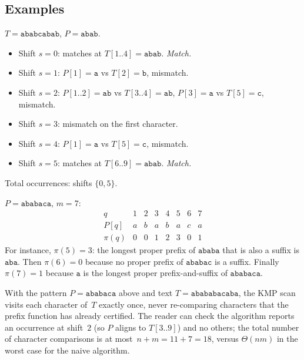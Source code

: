 \subsection*{Examples}

\begin{example}
\label{ex:naive-search}
$T = \texttt{ababcabab}$, $P = \texttt{abab}$.
\begin{itemize}
  \item Shift $s = 0$: matches at $T[1..4] = \texttt{abab}$. \emph{Match.}
  \item Shift $s = 1$: $P[1] = \texttt{a}$ vs $T[2] = \texttt{b}$, mismatch.
  \item Shift $s = 2$: $P[1..2] = \texttt{ab}$ vs $T[3..4] = \texttt{ab}$,
        $P[3] = \texttt{a}$ vs $T[5] = \texttt{c}$, mismatch.
  \item Shift $s = 3$: mismatch on the first character.
  \item Shift $s = 4$: $P[1] = \texttt{a}$ vs $T[5] = \texttt{c}$, mismatch.
  \item Shift $s = 5$: matches at $T[6..9] = \texttt{abab}$. \emph{Match.}
\end{itemize}
Total occurrences: shifts $\{0, 5\}$.
\end{example}

\begin{example}
\label{ex:prefix-function}
$P = \texttt{ababaca}$, $m = 7$:
\[
  \begin{array}{r|ccccccc}
    q       & 1 & 2 & 3 & 4 & 5 & 6 & 7 \\
    \hline
    P[q]    & a & b & a & b & a & c & a \\
    \pi(q)  & 0 & 0 & 1 & 2 & 3 & 0 & 1
  \end{array}
\]
For instance, $\pi(5) = 3$: the longest proper prefix of $\texttt{ababa}$
that is also a suffix is $\texttt{aba}$. Then $\pi(6) = 0$ because no
proper prefix of $\texttt{ababac}$ is a suffix. Finally $\pi(7) = 1$
because $\texttt{a}$ is the longest proper prefix-and-suffix of
$\texttt{ababaca}$.
\end{example}

\begin{example}
\label{ex:kmp-run}
With the pattern $P = \texttt{ababaca}$ above and text
$T = \texttt{abababacaba}$, the KMP scan visits each character of~$T$
exactly once, never re-comparing characters that the prefix function
has already certified. The reader can check the algorithm reports an
occurrence at shift~$2$ (so $P$ aligns to $T[3..9]$) and no others;
the total number of character comparisons is at most~$n + m = 11 + 7 = 18$, versus
$\Theta(nm)$ in the worst case for the naive algorithm.
\end{example}

